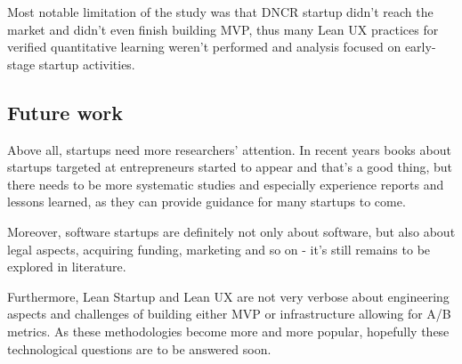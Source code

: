 \documentclass{article}
\begin{document}
Most notable limitation of the study was that DNCR startup didn't reach the market and didn't even finish building MVP, thus many Lean UX practices for verified quantitative learning weren't performed and analysis focused on early-stage startup activities.

\subsection{Future work}
Above all, startups need more researchers' attention. In recent years books about startups targeted at entrepreneurs started to appear and that's a good thing, but there needs to be more systematic studies and especially experience reports and lessons learned, as they can provide guidance for many startups to come.

Moreover, software startups are definitely not only about software, but also about legal aspects, acquiring funding, marketing and so on - it's still remains to be explored in literature.

Furthermore, Lean Startup and Lean UX are not very verbose about engineering aspects and challenges of building either MVP or infrastructure allowing for A/B metrics. As these methodologies become more and more popular, hopefully these technological questions are to be answered soon.

\listoffigures
 
\end{document}
